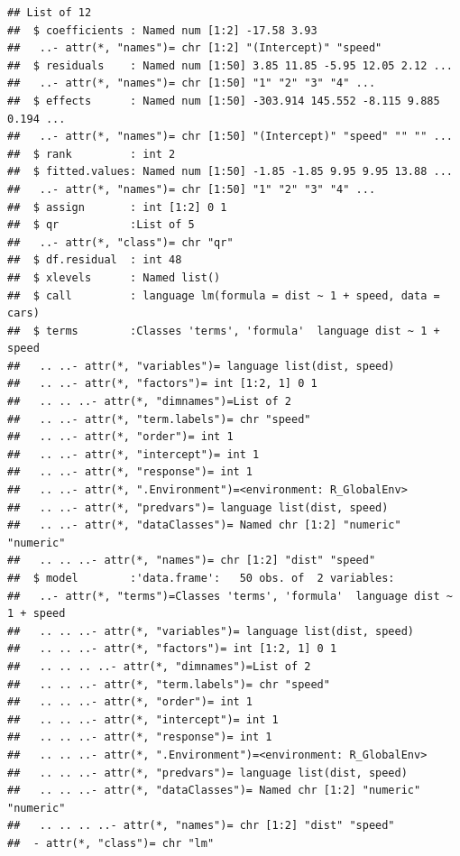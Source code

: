 \documentclass[krantz2]{krantz}\usepackage{knitr}%
\begin{document}
\begin{knitrout}\footnotesize
{}\color{fgcolor}\begin{kframe}
\begin{alltt}
  \hlstd{=} \hlstd{)}
\end{alltt}
\begin{verbatim}
## List of 12
##  $ coefficients : Named num [1:2] -17.58 3.93
##   ..- attr(*, "names")= chr [1:2] "(Intercept)" "speed"
##  $ residuals    : Named num [1:50] 3.85 11.85 -5.95 12.05 2.12 ...
##   ..- attr(*, "names")= chr [1:50] "1" "2" "3" "4" ...
##  $ effects      : Named num [1:50] -303.914 145.552 -8.115 9.885 0.194 ...
##   ..- attr(*, "names")= chr [1:50] "(Intercept)" "speed" "" "" ...
##  $ rank         : int 2
##  $ fitted.values: Named num [1:50] -1.85 -1.85 9.95 9.95 13.88 ...
##   ..- attr(*, "names")= chr [1:50] "1" "2" "3" "4" ...
##  $ assign       : int [1:2] 0 1
##  $ qr           :List of 5
##   ..- attr(*, "class")= chr "qr"
##  $ df.residual  : int 48
##  $ xlevels      : Named list()
##  $ call         : language lm(formula = dist ~ 1 + speed, data = cars)
##  $ terms        :Classes 'terms', 'formula'  language dist ~ 1 + speed
##   .. ..- attr(*, "variables")= language list(dist, speed)
##   .. ..- attr(*, "factors")= int [1:2, 1] 0 1
##   .. .. ..- attr(*, "dimnames")=List of 2
##   .. ..- attr(*, "term.labels")= chr "speed"
##   .. ..- attr(*, "order")= int 1
##   .. ..- attr(*, "intercept")= int 1
##   .. ..- attr(*, "response")= int 1
##   .. ..- attr(*, ".Environment")=<environment: R_GlobalEnv> 
##   .. ..- attr(*, "predvars")= language list(dist, speed)
##   .. ..- attr(*, "dataClasses")= Named chr [1:2] "numeric" "numeric"
##   .. .. ..- attr(*, "names")= chr [1:2] "dist" "speed"
##  $ model        :'data.frame':	50 obs. of  2 variables:
##   ..- attr(*, "terms")=Classes 'terms', 'formula'  language dist ~ 1 + speed
##   .. .. ..- attr(*, "variables")= language list(dist, speed)
##   .. .. ..- attr(*, "factors")= int [1:2, 1] 0 1
##   .. .. .. ..- attr(*, "dimnames")=List of 2
##   .. .. ..- attr(*, "term.labels")= chr "speed"
##   .. .. ..- attr(*, "order")= int 1
##   .. .. ..- attr(*, "intercept")= int 1
##   .. .. ..- attr(*, "response")= int 1
##   .. .. ..- attr(*, ".Environment")=<environment: R_GlobalEnv> 
##   .. .. ..- attr(*, "predvars")= language list(dist, speed)
##   .. .. ..- attr(*, "dataClasses")= Named chr [1:2] "numeric" "numeric"
##   .. .. .. ..- attr(*, "names")= chr [1:2] "dist" "speed"
##  - attr(*, "class")= chr "lm"
\end{verbatim}
\end{kframe}
\end{knitrout}
\end{document}
